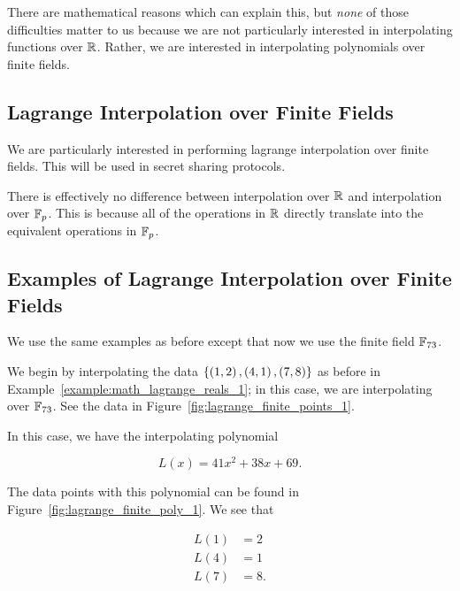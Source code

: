 There are mathematical reasons which can explain this,
but \emph{none} of those difficulties matter to us
because we are not particularly interested in interpolating
\glspl{function} over $\mathbb{R}$.
Rather, we are interested in interpolating polynomials over
\glspl{finite field}.

\subsection{Lagrange Interpolation over Finite Fields}

We are particularly interested in performing \gls{lagrange interpolation}
over \glspl{finite field}.
This will be used in secret sharing protocols.

There is effectively no difference between interpolation
over $\mathbb{R}$ and interpolation over $\mathbb{F}_{p}$.
This is because all of the operations in $\mathbb{R}$ directly translate
into the equivalent operations in $\mathbb{F}_{p}$.

\subsection{Examples of Lagrange Interpolation over Finite Fields}

We use the same examples as before except that now we use
the \gls{finite field} $\mathbb{F}_{73}$.



\begin{example}
\label{example:math_lagrange_finite_1}

We begin by interpolating the data
$\left\{ \left( 1,2 \right),\left( 4,1 \right),\left( 7,8 \right) \right\}$ as before
in Example~\ref{example:math_lagrange_reals_1};
in this case, we are interpolating over $\mathbb{F}_{73}$.
See the data in Figure~\ref{fig:lagrange_finite_points_1}.



In this case, we have the interpolating polynomial

\begin{equation}
    L(x) = 41x^{2} + 38x + 69.
\end{equation}

\noindent
The data points with this polynomial can be found in
Figure~\ref{fig:lagrange_finite_poly_1}.
We see that

\begin{align}
    L(1) &= 2 \nonumber\\
    L(4) &= 1 \nonumber\\
    L(7) &= 8.
\end{align}
\end{example}

